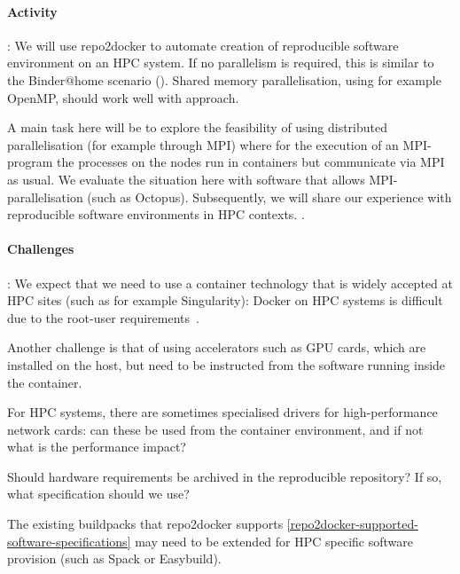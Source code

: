 \begin{task}
\paragraph*{Activity}: We will use repo2docker to automate creation of
reproducible software environment on an HPC system. If no parallelism is
required, this is similar to the Binder@home scenario
(). Shared memory parallelisation, using for
example OpenMP, should work well with approach.

A main task here will be to explore the feasibility of using distributed
parallelisation (for example through MPI) where for the execution of an
MPI-program the processes on the nodes run in containers but communicate via MPI
as usual. We evaluate the situation here with software that allows
MPI-parallelisation (such as Octopus). Subsequently, we will share our experience with
reproducible software environments in HPC contexts. .

\paragraph*{Challenges}: We expect that we need to use a container technology
that is widely accepted at HPC sites (such as for example Singularity): Docker
on HPC systems is difficult due to the root-user requirements~\cite{Gerhardt_2017}.

Another challenge is that of using accelerators such as GPU cards, which are
installed on the host, but need to be instructed from the software running
inside the container.

For HPC systems, there are sometimes specialised drivers for high-performance
network cards: can these be used from the container environment, and if not what
is the performance impact?  \cite{Liu2021}

Should hardware requirements be archived in the reproducible repository? If so,
what specification should we use?

The existing buildpacks that repo2docker supports
\ref{repo2docker-supported-software-specifications} may need to be extended for
HPC specific software provision (such as Spack or Easybuild).


\end{task}






